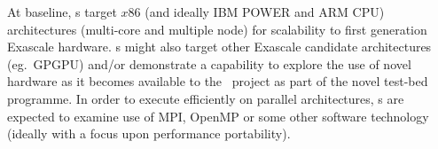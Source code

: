 At baseline, \papp s target $x86$ (and ideally IBM POWER and ARM 
CPU) architectures (multi-core and multiple node) for scalability to first 
generation Exascale hardware. \Papp s might also target other 
Exascale candidate architectures (eg.\ GPGPU) and/or demonstrate a capability to 
explore the use of novel hardware as it becomes available to the \exc \   
project as part of the novel test-bed programme. In order to execute
efficiently on parallel architectures, \papp s are expected to examine
use of MPI, OpenMP or some other software technology
(ideally with a focus upon performance portability).


